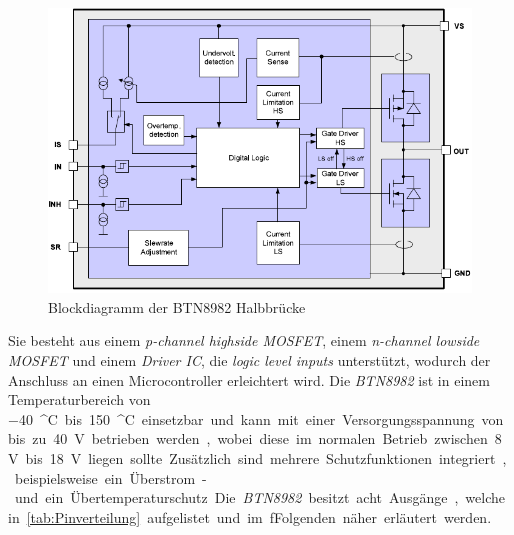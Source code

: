 \begin{figure} [H]
	\centering
	\includegraphics[width=0.5\linewidth]{Bilder/btn8982.pdf}
	\caption{Blockdiagramm der BTN8982 Halbbrücke}
	\label{fig:btn8982}
\end{figure}\noindent
Sie besteht aus einem \textit{p-channel highside MOSFET}, einem \textit{n-channel lowside MOSFET} und einem \textit{Driver IC}, die \textit{logic level inputs} unterstützt, wodurch der Anschluss an einen Microcontroller erleichtert wird. Die \textit{BTN8982} ist in einem Temperaturbereich von \SI{-40}{^\circ C} bis \SI{150}{^\circ C} einsetzbar und kann mit einer Versorgungsspannung von bis zu \SI{40}{V} betrieben werden, wobei diese im normalen Betrieb zwischen \SI{8}{V} bis \SI{18}{V} liegen sollte. Zusätzlich sind mehrere Schutzfunktionen integriert, beispielsweise ein Überstrom- und ein Übertemperaturschutz. Die \textit{BTN8982} besitzt acht Ausgänge, welche in \autoref{tab:Pinverteilung} aufgelistet und im fFolgenden näher erläutert werden.


